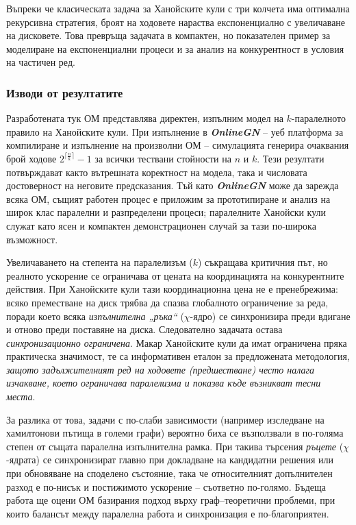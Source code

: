 Въпреки че класическата задача за Ханойските кули с три колчета има оптимална рекурсивна стратегия, броят на ходовете нараства експоненциално с увеличаване на дисковете. Това превръща задачата в компактен, но показателен пример за моделиране на експоненциални процеси и за анализ на конкурентност в условия на частичен ред.


\subsubsection{Изводи от резултатите}

\hspace*{2.5em}Разработената тук ОМ представлява директен, изпълним модел на $k$-паралелното правило на Ханойските кули. При изпълнение в \textbf{\textit{OnlineGN}} -- уеб платформа за компилиране и изпълнение на произволни ОМ -- симулацията генерира очаквания брой ходове $2^{\bigl\lceil \textstyle \frac{n}{k} \bigr\rceil} - 1$ за всички тествани стойности на $n$ и $k$. Тези резултати потвърждават както вътрешната коректност на модела, така и числовата достоверност на неговите предсказания. Тъй като \textbf{\textit{OnlineGN}} може да зарежда всяка ОМ, същият работен процес е приложим за прототипиране и анализ на широк клас паралелни и разпределени процеси; паралелните Ханойски кули служат като ясен и компактен демонстрационен случай за тази по-широка възможност.

Увеличаването на степента на паралелизъм ($k$) съкращава критичния път, но реалното ускорение се ограничава от цената на координацията на конкурентните действия. При Ханойските кули тази координационна цена не е пренебрежима: всяко преместване на диск трябва да спазва глобалното ограничение за реда, поради което всяка \emph{изпълнителна „ръка“} (\(\chi\)-ядро) се синхронизира преди вдигане и отново преди поставяне на диска. Следователно задачата остава \emph{синхронизационно ограничена}. Макар Ханойските кули да имат ограничена пряка практическа значимост, те са информативен еталон за предложената методология, \emph{защото задължителният ред на ходовете (предшестване) често налага изчакване, което ограничава паралелизма и показва къде възникват тесни места}.

За разлика от това, задачи с по-слаби зависимости (например изследване на хамилтонови пътища в големи графи) вероятно биха се възползвали в по-голяма степен от същата паралелна изпълнителна рамка. При такива търсения \emph{ръцете} (\(\chi\)-ядрата) се синхронизират главно при докладване на кандидатни решения или при обновяване на споделено състояние, така че относителният допълнителен разход е по-нисък и постижимото ускорение -- съответно по-голямо. Бъдеща работа ще оцени ОМ базирания подход върху граф--теоретични проблеми, при които балансът между паралелна работа и синхронизация е по-благоприятен.


